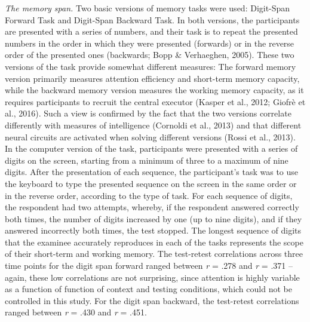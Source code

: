 \documentclass[authordate, empirical]{jote-new-article}
\begin{document}
\emph{The memory span. }Two basic versions of memory tasks were used: Digit-Span Forward Task and Digit-Span Backward Task. In both versions, the participants are presented with a series of numbers, and their task is to repeat the presented numbers in the order in which they were presented (forwards) or in the reverse order of the presented ones (backwards; Bopp \& Verhaeghen, 2005). These two versions of the task provide somewhat different measures: The forward memory version primarily measures attention efficiency and short-term memory capacity, while the backward memory version measures the working memory capacity, as it requires participants to recruit the central executor (Kasper et al., 2012; Giofrè et al., 2016). Such a view is confirmed by the fact that the two versions correlate differently with measures of intelligence (Cornoldi et al., 2013) and that different neural circuits are activated when solving different versions (Rossi et al., 2013). In the computer version of the task, participants were presented with a series of digits on the screen, starting from a minimum of three to a maximum of nine digits. After the presentation of each sequence, the participant's task was to use the keyboard to type the presented sequence on the screen in the same order or in the reverse order, according to the type of task. For each sequence of digits, the respondent had two attempts, whereby, if the respondent answered correctly both times, the number of digits increased by one (up to nine digits), and if they answered incorrectly both times, the test stopped. The longest sequence of digits that the examinee accurately reproduces in each of the tasks represents the scope of their short-term and working memory. The test-retest correlations across three time points for the digit span forward ranged between\emph{ r} = .278 and \emph{r} = .371 -- again, these low correlations are not surprising, since attention is highly variable as a function of function of context and testing conditions, which could not be controlled in this study. For the digit span backward, the test-retest correlations ranged between \emph{r} = .430 and \emph{r} = .451.
\end{document}
